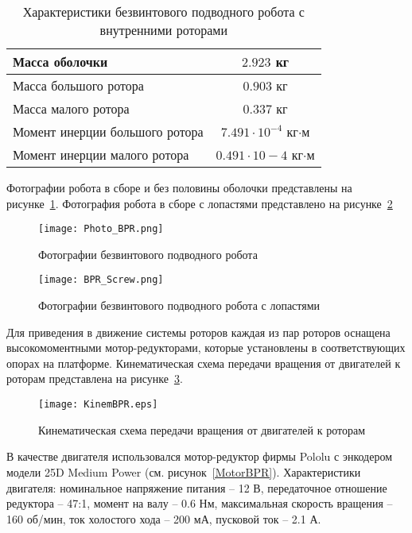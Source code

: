 \begin{table}[h]
	\centering
	\caption{Характеристики безвинтового подводного робота с внутренними роторами}\label{tabCharBPR}
	\begin{tabular}{|l|c|}
		\hline
		Масса оболочки	&	$2.923$ кг 	\\ \hline
		Масса большого ротора &	$0.903$ кг	\\ \hline
		Масса малого ротора &	$0.337$ кг \\ \hline
		Момент инерции большого ротора 	& $7.491\cdot10^{-4}$ кг$\cdot$м \\ \hline
		Момент инерции малого ротора &  $0.491\cdot10-4$ кг$\cdot$м\\ \hline
	\end{tabular}
\end{table}

Фотографии робота в сборе и без половины оболочки представлены на рисунке~\ref{Photo_BPR}. Фотография робота в сборе с лопастями представлено на рисунке~\ref{Photo_BPR_Screw}

\begin{figure}[h]
	\centering
	\texttt{[image: Photo\_BPR.png]}%
	\caption{Фотографии безвинтового подводного робота}
	\label{Photo_BPR}
\end{figure}

\begin{figure}[h]
	\centering
	\texttt{[image: BPR\_Screw.png]}%
	\caption{Фотографии безвинтового подводного робота с лопастями}
	\label{Photo_BPR_Screw}
\end{figure}


Для приведения в движение системы роторов каждая из пар роторов оснащена высокомоментными мотор-редукторами, которые установлены в соответствующих опорах на платформе. Кинематическая схема передачи вращения от двигателей к роторам представлена на рисунке~\ref{KinemBPR}.

\begin{figure}[h]
	\centering
	\texttt{[image: KinemBPR.eps]}%
	\caption{Кинематическая схема передачи вращения от двигателей к роторам}
	\label{KinemBPR}
\end{figure}

В качестве двигателя использовался мотор-редуктор фирмы Pololu с энкодером модели 25D Medium Power (см. рисунок~\ref{MotorBPR}). Характеристики двигателя: номинальное напряжение питания -- 12 В, передаточное отношение редуктора -- 47:1, момент на валу -- 0.6 Нм, максимальная скорость вращения -- 160 об/мин, ток холостого хода -- 200 мА, пусковой ток -- 2.1 А. 

